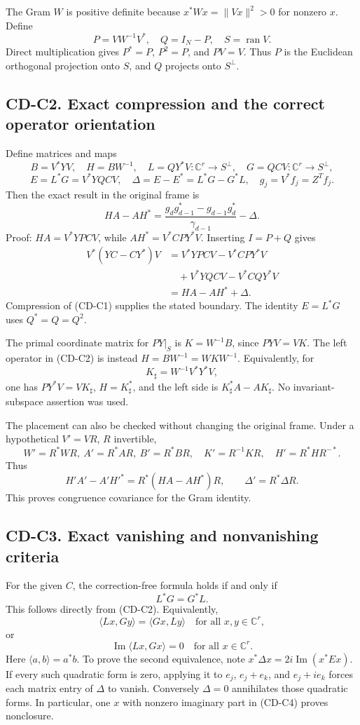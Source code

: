 The Gram \(W\) is positive definite because \(x^*Wx=\|Vx\|^2>0\) for nonzero \(x\). Define \[
P=VW^{-1}V^*,\quad Q=I_N-P,\quad S=\operatorname{ran}V.
\] Direct multiplication gives \(P^*=P\), \(P^2=P\), and \(PV=V\). Thus \(P\) is the Euclidean orthogonal projection onto \(S\), and \(Q\) projects onto \(S^\perp\).

\subsection{CD-C2. Exact compression and the correct operator orientation}\label{cdaudit:cd-c2.-exact-compression-and-the-correct-operator-orientation}

Define matrices and maps \[
B=V^*YV,\quad H=BW^{-1},\quad
L=QY^*V:\mathbb C^r\to S^\perp,\quad
G=QCV:\mathbb C^r\to S^\perp,
\] \[
E=L^*G=V^*YQCV,\quad
\Delta=E-E^*=L^*G-G^*L,\quad g_j=V^*f_j=Z^Tf_j.
\] Then the exact result in the original frame is \[
\boxed{HA-AH^*
=\frac{g_dg_{d-1}^*-g_{d-1}g_d^*}{\gamma_{d-1}}-\Delta.}
\tag{CD-C2}
\] Proof: \(HA=V^*YPCV\), while \(AH^*=V^*CPY^*V\). Inserting \(I=P+Q\) gives \[
\begin{aligned}
V^*(YC-CY^*)V
&=V^*YPCV-V^*CPY^*V\\
&\quad+V^*YQCV-V^*CQY^*V\\
&=HA-AH^*+\Delta.
\end{aligned}
\] Compression of (CD-C1) supplies the stated boundary. The identity \(E=L^*G\) uses \(Q^*=Q=Q^2\).

The primal coordinate matrix for \(PY|_S\) is \(K=W^{-1}B\), since \(PYV=VK\). The left operator in (CD-C2) is instead \(H=BW^{-1}=WKW^{-1}\). Equivalently, for \[
K_\sharp=W^{-1}V^*Y^*V,
\] one has \(PY^*V=VK_\sharp\), \(H=K_\sharp^*\), and the left side is \(K_\sharp^*A-AK_\sharp\). No invariant-subspace assertion was used.

The placement can also be checked without changing the original frame. Under a hypothetical \(V'=VR\), \(R\) invertible, \[
W'=R^*WR,\ A'=R^*AR,\ B'=R^*BR,\quad
K'=R^{-1}KR,\quad H'=R^*HR^{-*}.
\] Thus \[
H'A'-A'H'^*=R^*(HA-AH^*)R,\qquad \Delta'=R^*\Delta R.
\] This proves congruence covariance for the Gram identity.

\subsection{CD-C3. Exact vanishing and nonvanishing criteria}\label{cdaudit:cd-c3.-exact-vanishing-and-nonvanishing-criteria}

For the given \(C\), the correction-free formula holds if and only if \[
\boxed{L^*G=G^*L.}
\tag{CD-C3}
\] This follows directly from (CD-C2). Equivalently, \[
\langle Lx,Gy\rangle=\langle Gx,Ly\rangle
\quad\text{for all }x,y\in\mathbb C^r,
\] or \[
\operatorname{Im}\langle Lx,Gx\rangle=0
\quad\text{for all }x\in\mathbb C^r.
\tag{CD-C4}
\] Here \(\langle a,b\rangle=a^*b\). To prove the second equivalence, note \(x^*\Delta x=2i\operatorname{Im}(x^*Ex)\). If every such quadratic form is zero, applying it to \(e_j\), \(e_j+e_k\), and \(e_j+ie_k\) forces each matrix entry of \(\Delta\) to vanish. Conversely \(\Delta=0\) annihilates those quadratic forms. In particular, one \(x\) with nonzero imaginary part in (CD-C4) proves nonclosure.

